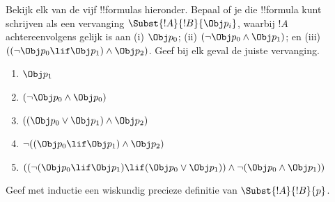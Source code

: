 \documentclass[../../../include/open-logic-section]{subfiles}
\begin{document}
\begin{prob} Bekijk elk van de vijf !!{formula}s hieronder. Bepaal of
 je die !!{formula} kunt schrijven als een vervanging
 \( \Subst{!A}{!B}{\Obj p_i} \), waarbij \( !A \) achtereenvolgens
 gelijk is aan (i) \( \Obj p_0 \); (ii) \( ( \lnot \Obj p_0 \land \Obj
 p_1) \); en (iii) \( ( ( \lnot \Obj p_0 \lif \Obj p_1 ) \land \Obj
 p_2 ) \). Geef bij elk geval de juiste vervanging.
  \begin{enumerate}
    \item \( \Obj p_1 \) 
    \item \( ( \lnot \Obj p_0 \land \Obj p_0 ) \)
    \item \( ( ( \Obj p_0 \lor \Obj p_1 ) \land \Obj p_2 )  \)
    \item \( \lnot ( ( \Obj p_0 \lif \Obj p_1 ) \land \Obj p_2 ) \)
    \item \( (( \lnot ( \Obj p_0 \lif \Obj p_1 ) \lif ( \Obj p_0 \lor \Obj p_1 )) \land \lnot ( \Obj p_0 \land \Obj p_1 )) \)
  \end{enumerate}
\end{prob}

\begin{prob}
Geef met inductie een wiskundig precieze definitie van
$\Subst{!A}{!B}{p}$.
\end{prob}
\end{document}
